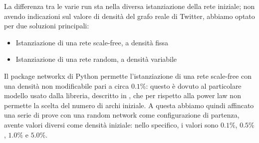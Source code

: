 \documentclass[a4paper,12pt]{article}
\begin{document}
La differenza tra le varie run sta nella diversa istanziazione della rete iniziale; non avendo indicazioni sul valore di densità del grafo reale di Twitter, abbiamo optato per due soluzioni principali:
\begin{itemize}
\item Istanziazione di una rete scale-free, a densità fissa
\item Istanziazione di una rete random, a densità variabile
\end{itemize}
Il package networkx di Python permette l'istanziazione di una rete scale-free con una densità non modificabile pari a circa $0.1\%$: questo è dovuto al particolare modello usato dalla libreria, descritto in \cite{sfnx}, che per rispetto alla power law non permette la scelta del numero di archi iniziale.
A questa abbiamo quindi affincato una serie di prove con una random network come configurazione di partenza, avente valori diversi come densità iniziale: nello specifico, i valori sono $0.1\%$, $0.5\%$, $1.0\%$ e $5.0\%$.
\end{document}
